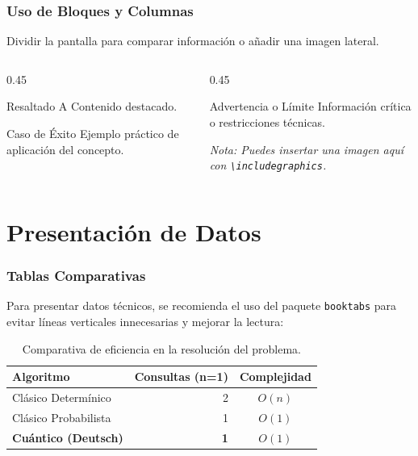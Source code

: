 \documentclass[aspectratio=169]{beamer} %
\begin{document}
\begin{frame}
\frametitle{Uso de Bloques y Columnas}
Dividir la pantalla para comparar información o añadir una imagen lateral.
\vspace{0.3cm}

\begin{columns}[T] %
    \begin{column}{0.45\textwidth}
        \begin{block}{Resaltado A}
            Contenido destacado.
        \end{block}
        
        \begin{exampleblock}{Caso de Éxito}
            Ejemplo práctico de aplicación del concepto.
        \end{exampleblock}
    \end{column}
    
    \begin{column}{0.45\textwidth}
        \begin{alertblock}{Advertencia o Límite}
            Información crítica o restricciones técnicas.
        \end{alertblock}
        \textit{Nota: Puedes insertar una imagen aquí con \texttt{\textbackslash includegraphics}.}
    \end{column}
\end{columns}
\end{frame}

\section{Presentación de Datos}
\activarlogoradiante{}
\begin{frame}
\frametitle{Tablas Comparativas}
Para presentar datos técnicos, se recomienda el uso del paquete \texttt{booktabs} para evitar líneas verticales innecesarias y mejorar la lectura:

\vspace{0.3cm}
\begin{table}
\centering
\begin{tabular}{lrc}
\toprule
\textbf{Algoritmo} & \textbf{Consultas (n=1)} & \textbf{Complejidad} \\
\midrule
Clásico Determínico & 2 & $O(n)$ \\
Clásico Probabilista & 1 & $O(1)$ \\
\textbf{Cuántico (Deutsch)} & \textbf{1} & \textbf{$O(1)$} \\
\bottomrule
\end{tabular}
\caption{Comparativa de eficiencia en la resolución del problema.}
\end{table}
\end{frame}
\desactivarlogoradiante{}
\end{document}
